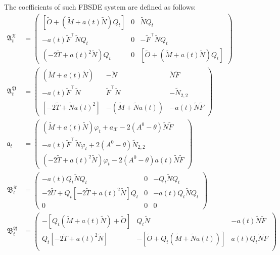 \documentclass[11pt,twoside]{amsart}
\theoremstyle{definition}
\numberwithin{equation}{section}
\renewcommand{\tilde}{\widetilde}
\begin{document}
The coefficients of such FBSDE system are defined as follows:
\begin{align*}
    \mathfrak{A}^{\mathfrak{X}}_t   &= 
    \begin{pmatrix}
        [\tilde{O} + (\tilde{M} + a(t)\tilde{N}) Q_t]   & 0 & \tilde{N}Q_t\\
        - a(t)\tilde{F}^\top\tilde{N} Q_t & 0 & - \tilde{F}^\top\tilde{N} Q_t \\ 
        (- 2\tilde{T} +a(t)^2 \tilde{N})Q_t  &0&[\tilde{O} + (\tilde{M} + a(t) \tilde{N})Q_t] 
    \end{pmatrix}\\
    \mathfrak{A}^{\mathfrak{Y}}_t   &=
    \begin{pmatrix}
        (\tilde{M} + a(t) \tilde{N})  & -\tilde{N} & \tilde{N}\tilde{F}\\
       - a(t)\tilde{F}^\top\tilde{N} & \tilde{F}^\top\tilde{N} & -\tilde{N}_{2,2}\\
        [-2\tilde{T} + \tilde{N}a(t)^2] &-(\widetilde{M} + \widetilde{N}a(t)) & -a(t)\tilde{N}\tilde{F}
    \end{pmatrix}\\
    \mathfrak{a}_t   &=
    \begin{pmatrix}
        (\tilde{M} + a(t) \tilde{N})\varphi_t + a_\mathcal{X}  - 2(A^0-\theta)\tilde{N}\tilde{F}\\
        - a(t) \tilde{F}^\top\tilde{N} \varphi_t +2(A^0-\theta)\tilde{N}_{2,2}\\
        (- 2\tilde{T} + a(t)^2\tilde{N})\varphi_t- 2(A^0-\theta)a(t) \tilde{N}\tilde{F}
    \end{pmatrix}\\
    \mathfrak{B}^{\mathfrak{X}}_t   &=
    \begin{pmatrix}
        - a(t) Q_t \widetilde{N} Q_t    & 0 & -  Q_t \widetilde{N} Q_t\\
     -2 \widetilde{U} +Q_t [-2\widetilde{T}+a(t)^2\widetilde{N}] Q_t  & 0 & - a(t)Q_t \widetilde{N} Q_t\\
     0 &0&0
    \end{pmatrix}\\
    \mathfrak{B}^{\mathfrak{Y}}_t   &=
    \begin{pmatrix}
      - [Q_t ( \widetilde{M} + a(t) \widetilde{N}) +\widetilde{O}] &  Q_t \widetilde{N} &- a(t)\tilde{N}\tilde{F}  \\
         Q_t[-2\widetilde{T}+a(t)^2\widetilde{N}] & - [\widetilde{O}+Q_t(\widetilde{M}+ \widetilde{N}a(t))] & a(t)Q_t\tilde{N}\tilde{F}\\

\end{pmatrix}
\end{align*}
\end{document}
